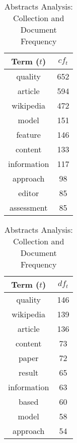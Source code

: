 \begin{table}[ht]
    \caption{Abstracts Analysis: Collection and Document Frequency}
    \label{tab:Abstracts_analysis}
    \begin{minipage}{.325\textwidth}
        \centering
        \begin{tabular}{c c}
            \toprule
            Term ($t$) & $cf_t$ \\
            \midrule
            quality & 652 \\
            article & 594 \\
            wikipedia & 472 \\
            model & 151 \\
            feature & 146 \\
            content & 133 \\
            information & 117 \\
            approach & 98 \\
            editor & 85 \\
            assessment & 85 \\
            \bottomrule
        \end{tabular}
    \end{minipage}
    \begin{minipage}{.325\textwidth}
        \centering
        \begin{tabular}{c c}
            \toprule
            Term ($t$) & $df_t$ \\
            \midrule
            quality & 146 \\
            wikipedia & 139 \\
            article & 136 \\
            content & 73 \\
            paper & 72 \\
            result & 65 \\
            information & 63 \\
            based & 60 \\
            model & 58 \\
            approach & 54 \\
            \bottomrule
        \end{tabular}
    \end{minipage}
\end{table}
